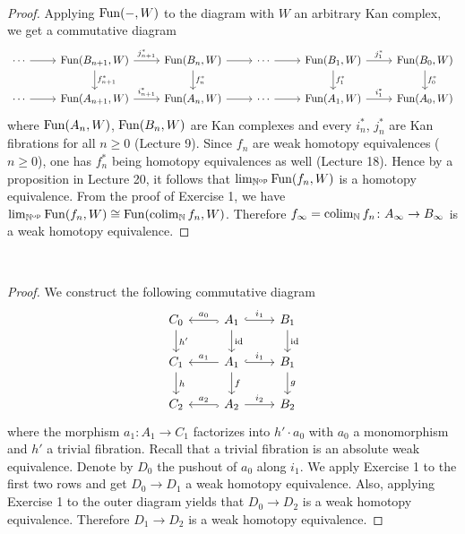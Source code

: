 \documentclass[a4paper,11pt,openany]{scrartcl}
\begin{document}
~\\
\begin{proof}
Applying $\operatorname{Fun}(-,W)$ to the diagram with $W$ an arbitrary Kan complex, we get a commutative diagram
\[
\begin{tikzcd}
\cdots\arrow[r]& \Fun(B_{n+1},W)\arrow[r,"j_{n+1}^*"]\arrow[d,"f_{n+1}^*"]& \Fun(B_n,W)\arrow[r]\arrow[d,"f_n^*"]& \cdots\arrow[r]& \Fun(B_1,W)\arrow[r,"j_1^*"]\arrow[d,"f_1^*"]& \Fun(B_0,W)\arrow[d,"f_0^*"]\\
\cdots\arrow[r]& \Fun(A_{n+1},W)\arrow[r,"i_{n+1}^*"]& \Fun(A_n,W)\arrow[r]& \cdots\arrow[r]& \Fun(A_1,W)\arrow[r,"i_1^*"]& \Fun(A_0,W)
\end{tikzcd}
\]
where $\operatorname{Fun}(A_n,W)$, $\operatorname{Fun}(B_n,W)$ are Kan complexes and every $i_n^*$, $j_n^*$ are Kan fibrations for all $n\geqslant0$ (Lecture 9). Since $f_n$ are weak homotopy equivalences ($n\geqslant0$), one has $f_n^*$ being homotopy equivalences as well (Lecture 18). Hence by a proposition in Lecture 20, it follows that $\lim_{\mathbb{N}^{\operatorname{op}}}\operatorname{Fun}(f_n,W)$ is a homotopy equivalence. From the proof of Exercise 1, we have $\lim_{\mathbb{N}^{\operatorname{op}}}\operatorname{Fun}(f_n,W)\cong\operatorname{Fun}(\operatorname{colim}_{\mathbb{N}}f_n,W)$. Therefore $f_\infty=\operatorname{colim}_{\mathbb{N}}f_n\colon A_\infty\to B_\infty$ is a weak homotopy equivalence.
\end{proof}

~\\
\begin{proof}
We construct the following commutative diagram
\[
\begin{tikzcd}
C_0\arrow[d,"h'"]& A_1\arrow[r,hookrightarrow,"i_1"]\arrow[d,"\id"]\arrow[l,hookrightarrow,"a_0"']& B_1\arrow[d,"\id"]\\
C_1\arrow[d,"h"]& A_1\arrow[r,hookrightarrow,"i_1"]\arrow[d,"f"]\arrow[l,"a_1"']& B_1\arrow[d,"g"]\\
C_2& A_2\arrow[r,"i_2"]\arrow[l,hookrightarrow,"a_2"']& B_2
\end{tikzcd}
\]
where the morphism $a_1\colon A_1\to C_1$ factorizes into $h'\cdot a_0$ with
    $a_0$ a monomorphism and $h'$ a trivial fibration. Recall that a trivial
    fibration is an absolute weak equivalence. Denote by $D_0$ the pushout of
    $a_0$ along $i_1$. We apply Exercise 1 to the first two rows and get $D_0\to
    D_1$ a weak homotopy equivalence. Also, applying Exercise 1 to the outer
    diagram yields that $D_0\to D_2$ is a weak homotopy equivalence. Therefore
    $D_1\to D_2$ is a weak homotopy equivalence.
\end{proof}
\end{document}
